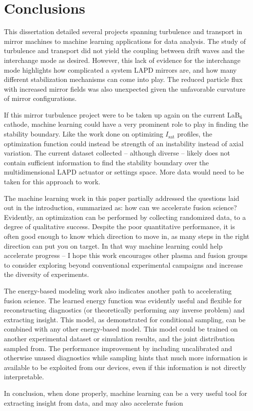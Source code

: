 \chapter{Conclusions}
\label{ch:conclusion}

This dissertation detailed several projects spanning turbulence and transport in mirror machines to machine learning applications for data analysis. The study of turbulence and transport did not yield the coupling between drift waves and the interchange mode as desired. However, this lack of evidence for the interchange mode highlights how complicated a system LAPD mirrors are, and how many different stabilization mechanisms can come into play. The reduced particle flux with increased mirror fields was also unexpected given the unfavorable curvature of mirror configurations.

If this mirror turbulence project were to be taken up again on the current LaB$_6$ cathode, machine learning could have a very prominent role to play in finding the stability boundary. Like the work done on optimizing $I_\text{sat}$ profiles, the optimization function could instead be strength of an instability instead of axial variation. The current dataset collected -- although diverse -- likely does not contain sufficient information to find the stability boundary over the multidimensional LAPD actuator or settings space. More data would need to be taken for this approach to work.

The machine learning work in this paper partially addressed the questions laid out in the introduction, summarized as: how can we accelerate fusion science? Evidently, an optimization can be performed by collecting randomized data, to a degree of qualitative success. Despite the poor quantitative performance, it is often good enough to know which direction to move in, as many steps in the right direction can put you on target. In that way machine learning could help accelerate progress -- I hope this work encourages other plasma and fusion groups to consider exploring beyond conventional experimental campaigns and increase the diversity of experiments. 

The energy-based modeling work also indicates another path to accelerating fusion science. The learned energy function was evidently useful and flexible for reconstructing diagnostics (or theoretically performing any inverse problem) and extracting insight. This model, as demonstrated for conditional sampling, can be combined with any other energy-based model. This model could be trained on another experimental dataset or simulation results, and the joint distribution sampled from. The performance improvement by including uncalibrated and otherwise unused diagnostics while sampling hints that much more information is available to be exploited from our devices, even if this information is not directly interpretable. 

In conclusion, when done properly, machine learning can be a very useful tool for extracting insight from data, and may also accelerate fusion 
